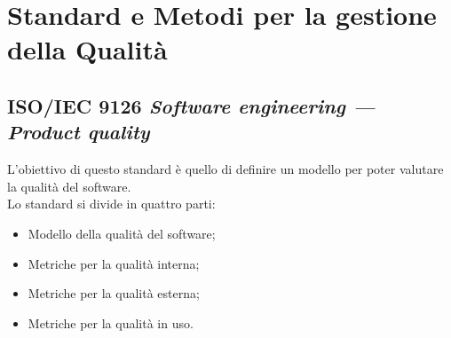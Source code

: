 \section{Standard e Metodi per la gestione della Qualità}
  \subsection{ISO/IEC 9126 \emph{Software engineering — Product quality}}
  L'obiettivo di questo standard è quello di definire un modello per poter valutare la qualità del software.\\
  Lo standard si divide in quattro parti:
  \begin{itemize}
    \item Modello della qualità del software;
    \item Metriche per la qualità interna;
    \item Metriche per la qualità esterna;
    \item Metriche per la qualità in uso.
  \end{itemize}
